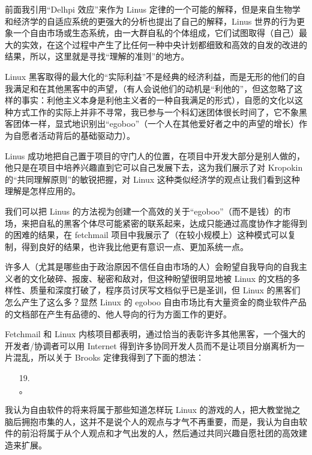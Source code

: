 前面我引用“Delhpi 效应”来作为 Linus 定律的一个可能的解释，但是来自生物学和经济学的自适应系统的更强大的分析也提出了自己的解释，Linus 世界的行为更象一个自由市场或生态系统，由一大群自私的个体组成，它们试图取得（自己）最大的实效，在这个过程中产生了比任何一种中央计划都细致和高效的自发的改进的结果，所以，这里就是寻找“理解的准则”的地方。


Linux 黑客取得的最大化的“实际利益”不是经典的经济利益，而是无形的他们的自我满足和在其他黑客中的声望，（有人会说他们的动机是“利他的”，但这忽略了这样的事实：利他主义本身是利他主义者的一种自我满足的形式），自愿的文化以这种方式工作的实际上并非不寻常，我已参与一个科幻迷团体很长时间了，它不象黑客团体一样，显式地识别出“egoboo”（一个人在其他爱好者之中的声望的增长）作为自愿者活动背后的基础驱动力）。


Linus 成功地把自己置于项目的守门人的位置，在项目中开发大部分是别人做的，他只是在项目中培养兴趣直到它可以自己发展下去，这为我们展示了对 Kropokin 的“共同理解原则”的敏锐把握，对 Linux 这种类似经济学的观点让我们看到这种理解是怎样应用的。


我们可以把 Linus 的方法视为创建一个高效的关于“egoboo”（而不是钱）的市场，来把自私的黑客个体尽可能紧密的联系起来，达成只能通过高度协作才能得到的困难的结果，在 fetchmail 项目中我展示了（在较小规模上）这种模式可以复制，得到良好的结果，也许我比他更有意识一点、更加系统一点。


许多人（尤其是哪些由于政治原因不信任自由市场的人）会盼望自我导向的自我主义者的文化破碎、报废、秘密和敌对，但这种盼望很明显地被 Linux 的文档的多样性、质量和深度打破了，程序员讨厌写文档似乎已是圣训，但 Linux 的黑客们怎么产生了这么多？显然 Linux 的 egoboo 自由市场比有大量资金的商业软件产品的文档部在产生有品德的、他人导向的行为方面工作的更好。


Fetchmail 和 Linux 内核项目都表明，通过恰当的表彰许多其他黑客，一个强大的开发者/协调者可以用 Internet 得到许多协同开发人员而不是让项目分崩离析为一片混乱，所以关于 Brooks 定律我得到了下面的想法：

\begin{enumerate}
\item[19.] \\ 。
\end{enumerate}

我认为自由软件的将来将属于那些知道怎样玩 Linux 的游戏的人，把大教堂抛之脑后拥抱市集的人，这并不是说个人的观点与才气不再重要，而是，我认为自由软件的前沿将属于从个人观点和才气出发的人，然后通过共同兴趣自愿社团的高效建造来扩展。


